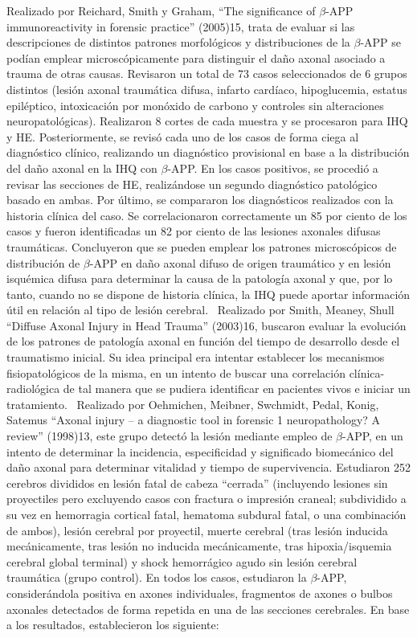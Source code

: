 Realizado por Reichard, Smith y Graham, “The significance of $\beta$-APP immunoreactivity in forensic practice” (2005)15, trata de evaluar si las descripciones de distintos patrones morfológicos y distribuciones de la $\beta$-APP se podían emplear microscópicamente para distinguir el daño axonal asociado a trauma de otras causas. Revisaron un total de 73 casos seleccionados de 6 grupos distintos (lesión axonal traumática difusa, infarto cardíaco, hipoglucemia, estatus epiléptico, intoxicación por monóxido de carbono y controles sin alteraciones neuropatológicas). Realizaron 8 cortes de cada muestra y se procesaron para IHQ y HE. Posteriormente, se revisó cada uno de los casos de forma ciega al diagnóstico clínico, realizando un diagnóstico provisional en base a la distribución del daño axonal en la IHQ con $\beta$-APP. En los casos positivos, se procedió a revisar las secciones de HE, realizándose un segundo diagnóstico patológico basado en ambas.  Por último, se compararon los diagnósticos realizados con la historia clínica del caso. Se correlacionaron correctamente un 85 por ciento de los casos y fueron identificadas un 82 por ciento de las lesiones axonales difusas traumáticas. Concluyeron que se pueden emplear los patrones microscópicos de distribución de $\beta$-APP en daño axonal difuso de origen traumático y en lesión isquémica difusa para determinar la causa de la patología axonal y que, por lo tanto, cuando no se dispone de historia clínica, la IHQ puede aportar información útil en relación al tipo de lesión cerebral. \
Realizado por Smith, Meaney, Shull “Diffuse Axonal Injury in Head Trauma” (2003)16, buscaron evaluar la evolución de los patrones de patología axonal en función del tiempo de desarrollo desde el traumatismo inicial. Su idea principal era intentar establecer los mecanismos fisiopatológicos de la misma, en un intento de buscar una correlación clínica-radiológica de tal manera que se pudiera identificar en pacientes vivos e iniciar un tratamiento. \
Realizado por Oehmichen, Meibner, Swchmidt, Pedal, Konig, Satemus “Axonal injury – a diagnostic tool in forensic 1 neuropathology? A review” (1998)13, este grupo detectó la lesión mediante empleo de $\beta$-APP, en un intento de determinar la incidencia, especificidad y significado biomecánico del daño axonal para determinar vitalidad y tiempo de supervivencia. Estudiaron 252 cerebros divididos en lesión fatal de cabeza “cerrada” (incluyendo lesiones sin proyectiles pero excluyendo casos con fractura o impresión craneal; subdividido a su vez en hemorragia cortical fatal, hematoma subdural fatal, o una combinación de ambos), lesión cerebral por proyectil, muerte cerebral (tras lesión inducida mecánicamente, tras lesión no inducida mecánicamente, tras hipoxia/isquemia cerebral global terminal) y shock hemorrágico agudo sin lesión cerebral traumática (grupo control). En todos los casos, estudiaron la $\beta$-APP, considerándola positiva en axones individuales, fragmentos de axones o bulbos axonales detectados de forma repetida en una de las secciones cerebrales. En base a los resultados, establecieron los siguiente:\
